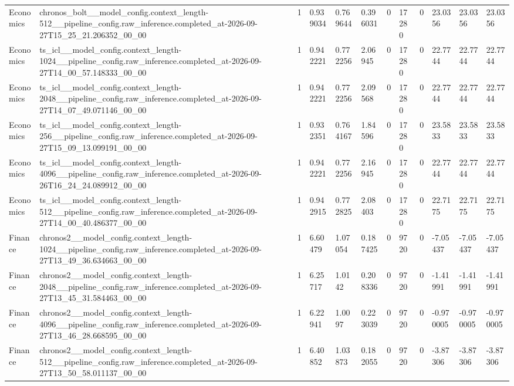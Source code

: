 \begin{tabular}{llllllllllll}
Economics & chronos\_bolt\_\_model\_config.context\_length-512\_\_pipeline\_config.raw\_inference.completed\_at-2026-09-27T15\_25\_21.206352\_00\_00 & 1 & 0.939034 & 0.769644 & 0.396031 & 0 & 17280 & 0 & 23.0356 & 23.0356 & 23.0356 \\
Economics & ts\_icl\_\_model\_config.context\_length-1024\_\_pipeline\_config.raw\_inference.completed\_at-2026-09-27T14\_00\_57.148333\_00\_00 & 1 & 0.942221 & 0.772256 & 2.06945 & 0 & 17280 & 0 & 22.7744 & 22.7744 & 22.7744 \\
Economics & ts\_icl\_\_model\_config.context\_length-2048\_\_pipeline\_config.raw\_inference.completed\_at-2026-09-27T14\_07\_49.071146\_00\_00 & 1 & 0.942221 & 0.772256 & 2.09568 & 0 & 17280 & 0 & 22.7744 & 22.7744 & 22.7744 \\
Economics & ts\_icl\_\_model\_config.context\_length-256\_\_pipeline\_config.raw\_inference.completed\_at-2026-09-27T15\_09\_13.099191\_00\_00 & 1 & 0.932351 & 0.764167 & 1.84596 & 0 & 17280 & 0 & 23.5833 & 23.5833 & 23.5833 \\
Economics & ts\_icl\_\_model\_config.context\_length-4096\_\_pipeline\_config.raw\_inference.completed\_at-2026-09-26T16\_24\_24.089912\_00\_00 & 1 & 0.942221 & 0.772256 & 2.16945 & 0 & 17280 & 0 & 22.7744 & 22.7744 & 22.7744 \\
Economics & ts\_icl\_\_model\_config.context\_length-512\_\_pipeline\_config.raw\_inference.completed\_at-2026-09-27T14\_00\_40.486377\_00\_00 & 1 & 0.942915 & 0.772825 & 2.08403 & 0 & 17280 & 0 & 22.7175 & 22.7175 & 22.7175 \\
Finance & chronos2\_\_model\_config.context\_length-1024\_\_pipeline\_config.raw\_inference.completed\_at-2026-09-27T13\_49\_36.634663\_00\_00 & 1 & 6.60479 & 1.07054 & 0.187425 & 0 & 9720 & 0 & -7.05437 & -7.05437 & -7.05437 \\
Finance & chronos2\_\_model\_config.context\_length-2048\_\_pipeline\_config.raw\_inference.completed\_at-2026-09-27T13\_45\_31.584463\_00\_00 & 1 & 6.25717 & 1.0142 & 0.208336 & 0 & 9720 & 0 & -1.41991 & -1.41991 & -1.41991 \\
Finance & chronos2\_\_model\_config.context\_length-4096\_\_pipeline\_config.raw\_inference.completed\_at-2026-09-27T13\_46\_28.668595\_00\_00 & 1 & 6.22941 & 1.0097 & 0.223039 & 0 & 9720 & 0 & -0.970005 & -0.970005 & -0.970005 \\
Finance & chronos2\_\_model\_config.context\_length-512\_\_pipeline\_config.raw\_inference.completed\_at-2026-09-27T13\_50\_58.011137\_00\_00 & 1 & 6.40852 & 1.03873 & 0.182055 & 0 & 9720 & 0 & -3.87306 & -3.87306 & -3.87306 \\

\end{tabular}
